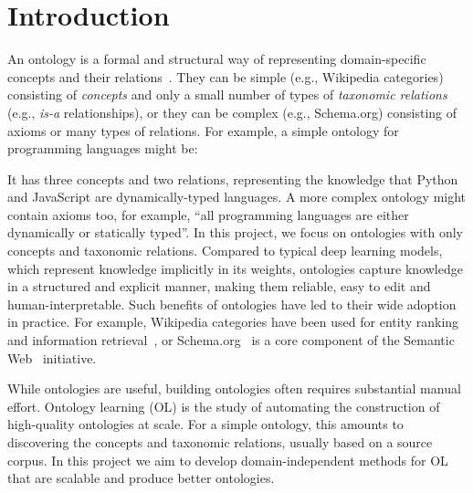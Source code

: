 \chapter{Introduction}  \label{chap:introduction}

\label{firstcontentpage} %

An ontology is a formal and structural way of representing domain-specific concepts and their relations~\cite{gruber1995toward}.
They can be simple (e.g., Wikipedia categories) consisting of \emph{concepts} and only a small number of types of \emph{taxonomic relations} (e.g., \emph{is-a} relationships), or they can be complex (e.g., Schema.org) consisting of axioms or many types of relations. For example, a simple ontology for programming languages might be:

\begin{figure}[H]
    \centering
    \sffamily
    \newcommand{\dist}{1.5cm}
\end{figure}

It has three concepts and two relations, representing the knowledge that Python and JavaScript are dynamically-typed languages. A more complex ontology might contain axioms too, for example, ``all programming languages are either dynamically or statically typed''.
In this project, we focus on ontologies with only concepts and taxonomic relations. Compared to typical deep learning models, which represent knowledge implicitly in its weights, ontologies capture knowledge in a structured and explicit manner, making them reliable, easy to edit and human-interpretable. Such benefits of ontologies have led to their wide adoption in practice. For example, Wikipedia categories have been used for entity ranking~\cite{vercoustre2008using} and information retrieval~\cite{sorg2012exploiting}, or Schema.org~\cite{Schema.org_2011} is a core component of the Semantic Web~\cite{antoniou2004semantic} initiative.

While ontologies are useful, building ontologies often requires substantial manual effort. Ontology learning (OL) is the study of automating the construction of high-quality ontologies at scale. For a simple ontology, this amounts to discovering the concepts and taxonomic relations, usually based on a source corpus. In this project we aim to develop domain-independent methods for OL that are scalable and produce better ontologies.

